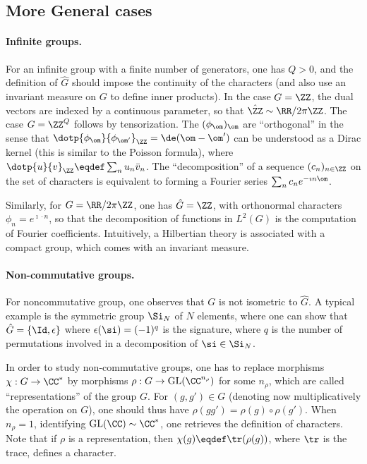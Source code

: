\subsection{More General cases}

\paragraph{Infinite groups.}

For an infinite group with a finite number of generators, one has  $Q>0$, and the definition of $\hat G$ should impose the continuity of the characters (and also use an invariant measure on $G$ to define inner products). In the case $G=\ZZ$, the dual vectors are indexed by a continuous parameter, 
so that $\hat \ZZ \sim \RR/2\pi\ZZ$.
%
The case $G=\ZZ^Q$ follows by tensorization. 
%
The $(\phi_\om)_\om$ are ``orthogonal'' in the sense that $\dotp{\phi_\om}{\phi_{\om'}}_\ZZ = \de(\om-\om')$ can be understood as a Dirac kernel (this is similar to the Poisson formula), where $\dotp{u}{v}_\ZZ \eqdef \sum_n u_n \bar v_n$. 
%
The ``decomposition'' of a sequence $(c_n)_{n \in \ZZ}$ on the set of characters is equivalent to forming a Fourier series $\sum_n c_n e^{-\imath n \om}$. 

Similarly, for $G=\RR/2\pi\ZZ$, one has $\hat G=\ZZ$, with orthonormal characters $\phi_n=e^{\imath \cdot n}$, so that the decomposition of functions in $L^2(G)$ is the computation of Fourier coefficients.
%
Intuitively, a Hilbertian theory is associated with a compact group, which comes with an invariant measure. 

\paragraph{Non-commutative groups.}
 
For noncommutative group, one observes that $G$ is not isometric to $\hat G$. A typical example is the symmetric group $\Si_N$ of $N$ elements, where one can show that $\hat G = \{\Id,\epsilon\}$ where $\epsilon(\si) = (-1)^{q}$ is the signature, where $q$ is the number of permutations involved in a decomposition of $\si \in \Si_N$. 

In order to study non-commutative groups, one has to replace morphisms $\chi : G \rightarrow \CC^*$ by morphisms $\rho : G \rightarrow \text{GL}(\CC^{n_\rho})$ for some $n_\rho$, which are called ``representations'' of the group $G$. For $(g,g') \in G$ (denoting now multiplicatively the operation on $G$), one should thus have $\rho(gg')=\rho(g) \circ \rho(g')$. When $n_\rho=1$, identifying $\text{GL}(\CC) \sim \CC^*$, one retrieves the definition of characters. Note that if $\rho$ is a representation, then $\chi(g) \eqdef \tr(\rho(g))$, where $\tr$ is the trace, defines a character. 

